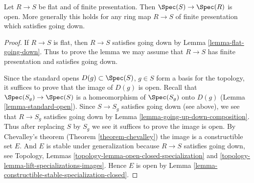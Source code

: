 \begin{proposition}
\label{proposition-fppf-open}
Let $R \to S$ be flat and of finite presentation.
Then $\Spec(S) \to \Spec(R)$ is open.
More generally this holds for any ring map $R \to S$ of
finite presentation which satisfies going down.
\end{proposition}

\begin{proof}
If $R \to S$ is flat, then $R \to S$ satisfies going down by
Lemma \ref{lemma-flat-going-down}. Thus to prove the lemma we may
assume that $R \to S$ has finite presentation and satisfies going down.

\medskip\noindent
Since the standard opens $D(g) \subset \Spec(S)$, $g \in S$
form a basis for the topology, it suffices to prove that the
image of $D(g)$ is open. Recall that $\Spec(S_g) \to \Spec(S)$
is a homeomorphism of $\Spec(S_g)$ onto $D(g)$
(Lemma \ref{lemma-standard-open}).
Since $S \to S_g$ satisfies going down (see above), we see that
$R \to S_g$ satisfies going down by
Lemma \ref{lemma-going-up-down-composition}. Thus after replacing
$S$ by $S_g$ we see it suffices to prove the image is open.
By Chevalley's theorem (Theorem \ref{theorem-chevalley})
the image is a constructible set $E$. And $E$ is stable
under generalization because $R \to S$ satisfies going down,
see Topology, Lemmas \ref{topology-lemma-open-closed-specialization}
and \ref{topology-lemma-lift-specializations-images}.
Hence $E$ is open by
Lemma \ref{lemma-constructible-stable-specialization-closed}.
\end{proof}